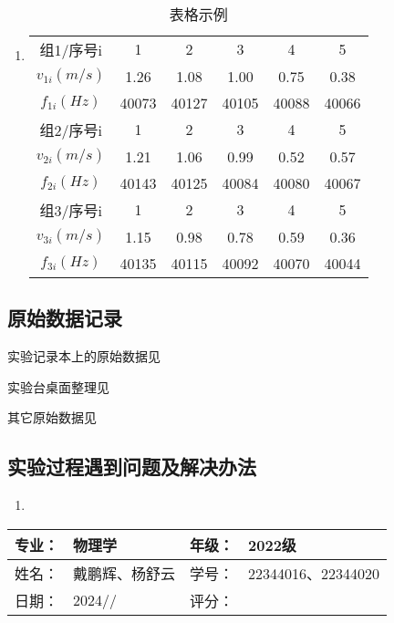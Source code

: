 \documentclass[dvipsnames, svgnames,a4paper,11pt]{article}
\begin{document}
	\subsubsection{}
	\begin{enumerate}
		\item \begin{table}[h]
			\centering
			\caption{表格示例}
			\label{tab:tab1}
			\begin{tabular}{|c|c|c|c|c|c|}
				\hline
				组1/序号i & 1 & 2 & 3 & 4 & 5 \\
				$v_{1i}(m/s)$ & 1.26 & 1.08 & 1.00 & 0.75 & 0.38 \\
				$f_{1i}(Hz)$ & 40073 & 40127 & 40105 & 40088 & 40066 \\
				\hline
				组2/序号i & 1 & 2 & 3 & 4 & 5 \\
				$v_{2i}(m/s)$ & 1.21 & 1.06 & 0.99 & 0.52 & 0.57 \\
				$f_{2i}(Hz)$ & 40143 & 40125 & 40084 & 40080 & 40067 \\
				\hline
				组3/序号i & 1 & 2 & 3 & 4 & 5 \\
				$v_{3i}(m/s)$ & 1.15 & 0.98 & 0.78 & 0.59 & 0.36 \\
				$f_{3i}(Hz)$ & 40135 & 40115 & 40092 & 40070 & 40044 \\
				\hline
			\end{tabular}
		\end{table}		
	\end{enumerate}
	
	
	\clearpage
	\subsection{原始数据记录}
	实验记录本上的原始数据见%
	
	实验台桌面整理见%
	
	其它原始数据见%
	
	\subsection{实验过程遇到问题及解决办法}
	\begin{enumerate}
		\item 
	\end{enumerate}
	
	
	
	\clearpage
	
	\begin{table}
		\renewcommand\arraystretch{1.7}
		\begin{tabularx}{\textwidth}{|X|X|X|X|}
			\hline
			专业：& 物理学 &年级：& 2022级\\
			\hline
			姓名： & 戴鹏辉、杨舒云 & 学号：& 22344016、22344020\\
			\hline
			日期：& 2024// & 评分： &\\
			\hline
		\end{tabularx}
	\end{table}
	
\end{document}
